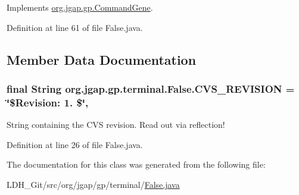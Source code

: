 Implements \hyperlink{classorg_1_1jgap_1_1gp_1_1_command_gene_a236141d99059da808afe7a9217e411c7}{org.\-jgap.\-gp.\-Command\-Gene}.



Definition at line 61 of file False.\-java.



\subsection{Member Data Documentation}
\hypertarget{classorg_1_1jgap_1_1gp_1_1terminal_1_1_false_a8ab125322197c9be2d002c892889f700}{
\subsubsection[{C\-V\-S\-\_\-\-R\-E\-V\-I\-S\-I\-O\-N}]{\setlength{\rightskip}{0pt plus 5cm}final String org.\-jgap.\-gp.\-terminal.\-False.\-C\-V\-S\-\_\-\-R\-E\-V\-I\-S\-I\-O\-N = \char`\"{}\$Revision\-: 1. \$\char`\"{}\hspace{0.3cm}{\ttfamily [static]}, {\ttfamily [private]}}}\label{classorg_1_1jgap_1_1gp_1_1terminal_1_1_false_a8ab125322197c9be2d002c892889f700}
String containing the C\-V\-S revision. Read out via reflection! 

Definition at line 26 of file False.\-java.



The documentation for this class was generated from the following file\-:\begin{DoxyCompactItemize}
\item 
L\-D\-H\-\_\-\-Git/src/org/jgap/gp/terminal/\hyperlink{_false_8java}{False.\-java}\end{DoxyCompactItemize}
